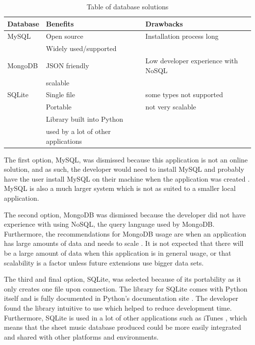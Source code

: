 \begin{table}[H]
\centering
\begin{tabular}{| l | l | l |} \hline
  {Database} & {Benefits} & {Drawbacks} \\ \hline
  MySQL & Open source & Installation process long \\
  & Widely used/supported & \\ \hline
  MongoDB & JSON friendly & Low developer experience with NoSQL \\ 
  & scalable & \\ \hline
  SQLite & Single file & some types not supported \\
  & Portable & not very scalable \\
  & Library built into Python & \\
  & used by a lot of other applications & \\ \hline
  
  
\end{tabular}
\caption{Table of database solutions}
\label{table:databases}
\end{table}

The first option, MySQL, was dismissed because this application is not an online solution, and as such, the developer would need to install MySQL and probably have the user install MySQL on their machine when the application was created \parencite{mysql}. MySQL is also a much larger system which is not as suited to a smaller local application.

The second option, MongoDB was dismissed because the developer did not have experience with using NoSQL, the query language used by MongoDB. Furthermore, the recommendations for MongoDB usage are when an application has large amounts of data and needs to scale \parencite{mongod}. It is not expected that there will be a large amount of data when this application is in general usage, or that scalability is a factor unless future extensions use bigger data sets.

The third and final option, SQLite, was selected because of its portability as it only creates one file upon connection. The library for SQLite comes with Python itself and is fully documented in Python's documentation site \parencite{PythonSQLite}. The developer found the library intuitive to use which helped to reduce development time. Furthermore, SQLite is used in a lot of other applications such as iTunes \parencite{sqliteusers}, 
which means that the sheet music database produced  could be more easily integrated and shared with other platforms and environments.

